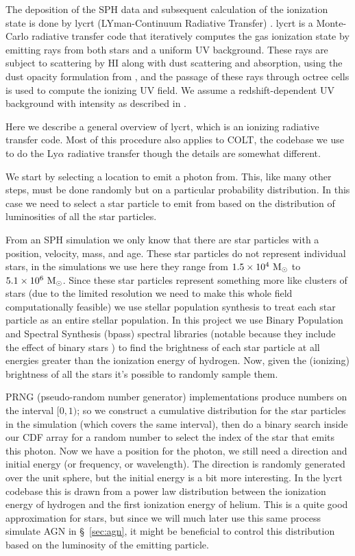 The deposition of the SPH data and subsequent calculation of the ionization state is done by {\sc lycrt} (LYman-Continuum Radiative Transfer) \citep{Ma2015}.
{\sc lycrt} is a Monte-Carlo radiative transfer code that iteratively computes the gas ionization state by emitting rays from both stars and a uniform UV background.
These rays are subject to scattering by HI along with dust scattering and absorption, using the dust opacity formulation from \citet{Li2001}, and the passage of these rays through octree cells is used to compute the ionizing UV field.
We assume a redshift-dependent UV background with intensity as described in \citet{Faucher-Giguere2009}.

Here we describe a general overview of {\sc lycrt}, which is an ionizing radiative transfer code.
Most of this procedure also applies to {\sc COLT}, the codebase we use to do the Ly$\alpha$ radiative transfer though the details are somewhat different.

We start by selecting a location to emit a photon from.
This, like many other steps, must be done randomly but on a particular probability distribution.
In this case we need to select a star particle to emit from based on the distribution of luminosities of all the star particles.

From an SPH simulation we only know that there are star particles with a position, velocity, mass, and age.
These star particles do not represent individual stars, in the simulations we use here they range from $1.5\times10^{4}\ \rm{M}_{\odot}$ to $5.1\times10^{6}\ \rm{M}_{\odot}$.
Since these star particles represent something more like clusters of stars (due to the limited resolution we need to make this whole field computationally feasible) we use stellar population synthesis to treat each star particle as an entire stellar population.
In this project we use Binary Population and Spectral Synthesis ({\sc bpass}) spectral libraries (notable because they include the effect of binary stars \citep{Eldridge2008}) to find the brightness of each star particle at all energies greater than the ionization energy of hydrogen.
Now, given the (ionizing) brightness of all the stars it's possible to randomly sample them.

PRNG (pseudo-random number generator) implementations produce numbers on the interval $[0, 1)$; so we construct a cumulative distribution for the star particles in the simulation (which covers the same interval), then do a binary search inside our CDF array for a random number to select the index of the star that emits this photon.
Now we have a position for the photon, we still need a direction and initial energy (or frequency, or wavelength).
The direction is randomly generated over the unit sphere, but the initial energy is a bit more interesting.
In the {\sc lycrt} codebase this is drawn from a power law distribution between the ionization energy of hydrogen and the first ionization energy of helium.
This is a quite good approximation for stars, but since we will much later use this same process simulate AGN in \S~\ref{sec:agn}, it might be beneficial to control this distribution based on the luminosity of the emitting particle.


